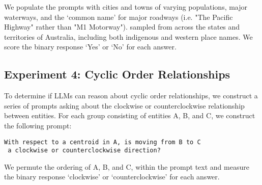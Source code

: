 \noindent We populate the prompts with cities and towns of varying populations, major waterways, and the `common name' for major roadways (i.e. "The Pacific Highway" rather than "M1 Motorway"). sampled from across the states and territories of Australia, including both indigenous and western place names.
We score the binary response `Yes' or `No' for each answer.

\subsection{Experiment 4: Cyclic Order Relationships}
To determine if LLMs can reason about cyclic order relationships, we construct a series of prompts asking about the clockwise or counterclockwise relationship between entities.
For each group consisting of entities A, B, and C, we construct the following prompt: 

\begin{lstlisting}[title=Prompt 12: Cyclic Order Relation Prompt]
 With respect to a centroid in A, is moving from B to C 
 a clockwise or counterclockwise direction?
\end{lstlisting}

\noindent We permute the ordering of A, B, and C, within the prompt text and measure the binary response `clockwise' or `counterclockwise' for each answer.










